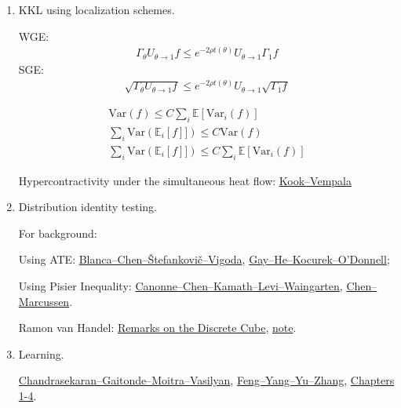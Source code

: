 \documentclass[11pt]{article}
\theoremstyle{plain}
\theoremstyle{definition}
\theoremstyle{remark}
\newcommand{\E}{\mathbb{E}}
\newcommand{\Var}{\mathrm{Var}}
\newcommand{\norm}[1]{\left\lVert #1 \right\rVert}
\begin{document}
\begin{enumerate}
    \item KKL using localization schemes.
    
    WGE: 
        \begin{align}\label{eq:WGE}
            \Gamma_{\theta} U_{\theta \to 1} f \leq e^{-2\rho t(\theta)} U_{\theta \to 1} \Gamma_1 f %
        \end{align}
        SGE:
        \begin{align}\label{eq:SGE}
            \sqrt{\Gamma_{\theta} U_{\theta \to 1} f} \leq e^{-2\rho t(\theta)} U_{\theta \to 1} \sqrt{\Gamma_1 f} %
        \end{align}
        
        \begin{align*}
            \Var(f) \le C \sum_i \E[\Var_i(f)] \tag{Poincare} \\
            \sum_i \Var(\E_i[f]]) \le C \Var(f) \tag{SI}\\
            \sum_i \Var(\E_i[f]]) \le C \sum_i \E[\Var_i(f)] \tag{GE? (Appeared in Marton's paper)}
        \end{align*}

    Hypercontractivity under the simultaneous heat flow: 
    \href{https://arxiv.org/pdf/2507.18021}{Kook--Vempala}

    \item Distribution identity testing.

    For background: 
    
    Using ATE: 
    \href{https://arxiv.org/pdf/2207.09102}{Blanca--Chen--Štefankovič--Vigoda}, \href{https://arxiv.org/pdf/2506.23456}{Gay--He--Kocurek--O'Donnell};

    Using Pisier Inequality:
    \href{https://arxiv.org/pdf/1911.07357}{Canonne--Chen--Kamath--Levi--Waingarten}, \href{https://arxiv.org/pdf/2302.09013}{Chen--Marcussen}.

    Ramon van Handel:
    \href{https://simons.berkeley.edu/workshops/probability-geometry-computation-high-dimensions-boot-camp/schedule#simons-tabs}{Remarks on the Discrete Cube},
    \href{https://www.cs.toronto.edu/~rosenthal/RvH_discrete_cube.pdf}{note}.

    \item Learning.

    \href{https://arxiv.org/pdf/2604.06109}{Chandrasekaran--Gaitonde--Moitra--Vasilyan},
    \href{https://arxiv.org/pdf/2607.08303}{Feng--Yang--Yu--Zhang},
    \href{https://arxiv.org/pdf/2105.10386}{Chapters 1-4}.
    
\end{enumerate}


%
%
\end{document}
